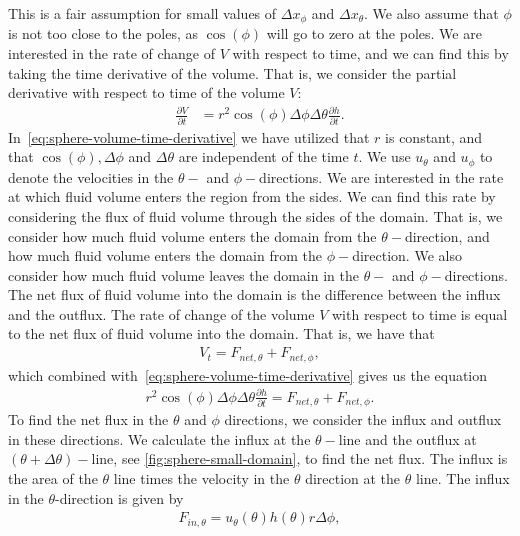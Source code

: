 This is a fair assumption for small values of $\Delta x_{\phi}$ and $\Delta x_{\theta}$.
We also assume that $\phi$ is not too close to the poles, as $\cos(\phi)$ will go to zero at the poles.
We are interested in the rate of change of $V$ with respect to time, and we can find this by taking the time derivative of the volume.
That is, we consider the partial derivative with respect to time of the volume $V$:
\begin{align}\label{eq:sphere-volume-time-derivative}
    \frac{\partial V}{\partial t} &= r^2 \cos(\phi) \Delta \phi \Delta \theta \frac{\partial h}{\partial t}.
\end{align}
In~\eqref{eq:sphere-volume-time-derivative} we have utilized that $r$ is constant, and that $\cos(\phi), \Delta \phi$ and $\Delta \theta$ are independent of the time $t$.
We use $u_{\theta}$ and $u_{\phi}$ to denote the velocities in the $\theta-$ and $\phi-$directions.
We are interested in the rate at which fluid volume enters the region from the sides.
We can find this rate by considering the flux of fluid volume through the sides of the domain.
That is, we consider how much fluid volume enters the domain from the $\theta-$direction, and how much fluid volume enters the domain from the $\phi-$direction.
We also consider how much fluid volume leaves the domain in the $\theta-$ and $\phi-$directions.
The net flux of fluid volume into the domain is the difference between the influx and the outflux.
The rate of change of the volume $V$ with respect to time is equal to the net flux of fluid volume into the domain.
That is, we have that
\begin{align}\label{eq:V_t-F_net}
    V_t = F_{net, \theta} + F_{net, \phi},
\end{align}
which combined with~\eqref{eq:sphere-volume-time-derivative} gives us the equation
\begin{align}\label{eq:sphere-volume-time-combined}
    r^2 \cos(\phi) \Delta \phi \Delta \theta \frac{\partial h}{\partial t} = F_{net, \theta} + F_{net, \phi}.
\end{align}
To find the net flux in the $\theta$ and $\phi$ directions, we consider the influx and outflux in these directions.
We calculate the influx at the $\theta-$line and the outflux at $(\theta + \Delta \theta)-$line, see \autoref{fig:sphere-small-domain}, to find the net flux.
The influx is the area of the $\theta$ line times the velocity in the $\theta$ direction at the $\theta$ line.
The influx in the $\theta$-direction is given by
\begin{align*}
    F_{in, \theta} = u_\theta(\theta) h(\theta)  r \Delta \phi,
\end{align*}
